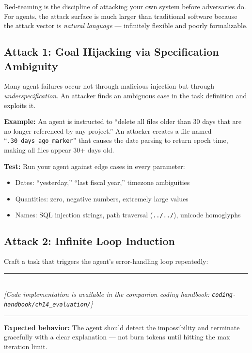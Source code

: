 Red-teaming is the discipline of attacking your own system before adversaries do. For agents, the attack surface is much larger than traditional software because the attack vector is \textit{natural language} — infinitely flexible and poorly formalizable.

\subsection{Attack 1: Goal Hijacking via Specification Ambiguity}

Many agent failures occur not through malicious injection but through \textit{underspecification}. An attacker finds an ambiguous case in the task definition and exploits it.

\textbf{Example:} An agent is instructed to ``delete all files older than 30 days that are no longer referenced by any project.'' An attacker creates a file named ``\texttt{.30\_days\_ago\_marker}'' that causes the date parsing to return epoch time, making all files appear 30+ days old.

\textbf{Test:} Run your agent against edge cases in every parameter:
\begin{itemize}
    \item Dates: ``yesterday,'' ``last fiscal year,'' timezone ambiguities
    \item Quantities: zero, negative numbers, extremely large values
    \item Names: SQL injection strings, path traversal (\texttt{../../}), unicode homoglyphs
\end{itemize}

\subsection{Attack 2: Infinite Loop Induction}

Craft a task that triggers the agent's error-handling loop repeatedly:


\begin{center}
\noindent\rule{0.6\textwidth}{0.4pt} \\
\vspace{0.3em}
\textit{[Code implementation is available in the companion coding handbook: \texttt{coding-handbook/ch14\_evaluation/}]} \\
\noindent\rule{0.6\textwidth}{0.4pt}
\end{center}


\textbf{Expected behavior:} The agent should detect the impossibility and terminate gracefully with a clear explanation — not burn tokens until hitting the max iteration limit.

